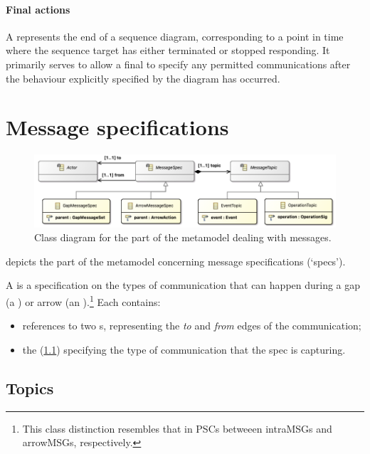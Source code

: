 \paragraph{Final actions}

A \mfinalaction{} represents the end of a sequence diagram, corresponding
to a point in time where the sequence target has either terminated or stopped
responding.  It primarily serves to allow a final \msequencegap{} to specify
any permitted communications after the behaviour explicitly specified by the
diagram has occurred.


\section{Message specifications}\label{sec:metamodel-messages}

\begin{figure}
	\centering
	\includegraphics[width=.8\textwidth]{diagrams/messages.png}
	\caption{Class diagram for the part of the \langname{} metamodel dealing with messages.}
	\label{fig:metamodel-messages}
\end{figure}

 depicts the part of the metamodel concerning
message specifications (`specs').

A \mmessagespec{} is a specification on the types of communication that can
happen during a gap (a \mgapmessagespec) or arrow (an \marrowmessagespec).\footnote{
This class distinction resembles that in PSCs betweeen intraMSGs and arrowMSGs,
respectively.}  Each \mmessagespec{} contains:

\begin{itemize}
\item
	references to two \mactor s, representing the \emph{to} and \emph{from}
	edges of the communication;
\item
	the \mmessagetopic{} (\cref{ssec:metamodel-messages-topics}) specifying
	the type of communication that the spec is capturing.
\end{itemize}

\subsection{Topics}\label{ssec:metamodel-messages-topics}

